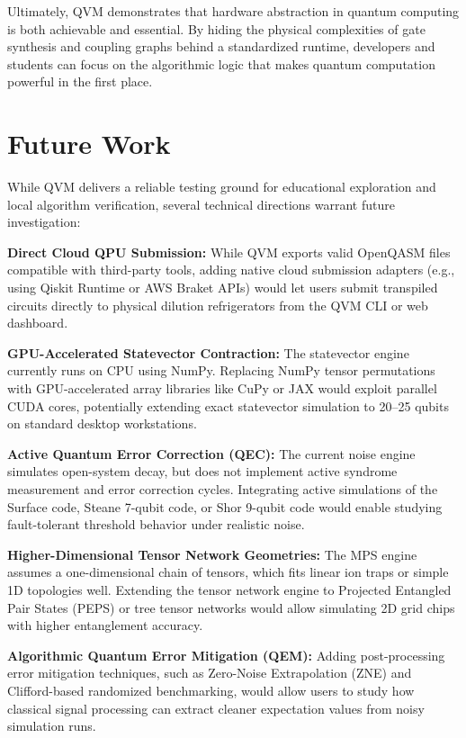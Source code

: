 Ultimately, QVM demonstrates that hardware abstraction in quantum computing is both achievable and essential. By hiding the physical complexities of gate synthesis and coupling graphs behind a standardized runtime, developers and students can focus on the algorithmic logic that makes quantum computation powerful in the first place.


\section{Future Work}

While QVM delivers a reliable testing ground for educational exploration and local algorithm verification, several technical directions warrant future investigation:

\textbf{Direct Cloud QPU Submission:} While QVM exports valid OpenQASM files compatible with third-party tools, adding native cloud submission adapters (e.g., using Qiskit Runtime or AWS Braket APIs) would let users submit transpiled circuits directly to physical dilution refrigerators from the QVM CLI or web dashboard.

\textbf{GPU-Accelerated Statevector Contraction:} The statevector engine currently runs on CPU using NumPy. Replacing NumPy tensor permutations with GPU-accelerated array libraries like CuPy or JAX would exploit parallel CUDA cores, potentially extending exact statevector simulation to 20--25 qubits on standard desktop workstations.

\textbf{Active Quantum Error Correction (QEC):} The current noise engine simulates open-system decay, but does not implement active syndrome measurement and error correction cycles. Integrating active simulations of the Surface code, Steane 7-qubit code, or Shor 9-qubit code would enable studying fault-tolerant threshold behavior under realistic noise.

\textbf{Higher-Dimensional Tensor Network Geometries:} The MPS engine assumes a one-dimensional chain of tensors, which fits linear ion traps or simple 1D topologies well. Extending the tensor network engine to Projected Entangled Pair States (PEPS) or tree tensor networks would allow simulating 2D grid chips with higher entanglement accuracy.

\textbf{Algorithmic Quantum Error Mitigation (QEM):} Adding post-processing error mitigation techniques, such as Zero-Noise Extrapolation (ZNE) and Clifford-based randomized benchmarking, would allow users to study how classical signal processing can extract cleaner expectation values from noisy simulation runs.

